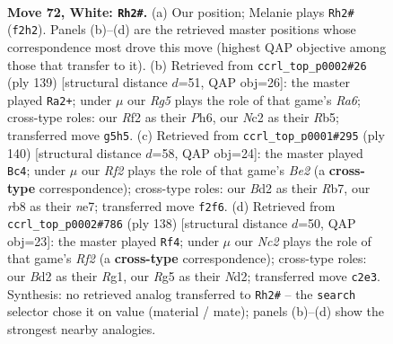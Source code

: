 \documentclass[11pt]{article}
\begin{document}
\clearpage

\begin{figure}[p]\centering
\begin{subfigure}{0.46\textwidth}\centering
\resizebox{\linewidth}{!}{%
\newchessgame
\chessboard[
  setfen={1rr5/pn5k/1p2p3/4P1R1/2P5/K5P1/P1NB1R2/8 w - - 3 72},
  showmover=false,
  pgfstyle=straightmove, color=movearrow, markmove={f2-h2}
]}
\caption{}
\end{subfigure}\hfill
\begin{subfigure}{0.46\textwidth}\centering
\resizebox{\linewidth}{!}{%
\newchessgame
\chessboard[
  setfen={2R5/2R2p1k/5P1p/1r1pp1p1/1P4P1/r6P/3K4/8 b - - 14 70},
  showmover=false,
  pgfstyle=straightmove, color=movearrow, markmove={a3-a2}
]}
\caption{}
\end{subfigure}
\\[4pt]
\begin{subfigure}{0.46\textwidth}\centering
\resizebox{\linewidth}{!}{%
\newchessgame
\chessboard[
  setfen={4r2k/1R2n3/4rp1p/7P/5P2/4P3/4BK2/7R w - - 0 71},
  showmover=false,
  pgfstyle=straightmove, color=movearrow, markmove={e2-c4}
]}
\caption{}
\end{subfigure}\hfill
\begin{subfigure}{0.46\textwidth}\centering
\resizebox{\linewidth}{!}{%
\newchessgame
\chessboard[
  setfen={4r3/6r1/2k5/p1p3P1/P2p4/4n2P/3N1R1K/6R1 w - - 1 70},
  showmover=false,
  pgfstyle=straightmove, color=movearrow, markmove={f2-f4}
]}
\caption{}
\end{subfigure}
\caption{\textbf{Move 72, White: \texttt{Rh2\#}.} (a) Our position; Melanie plays \texttt{Rh2\#} (\texttt{f2h2}). Panels (b)--(d) are the retrieved master positions whose correspondence most drove this move (highest QAP objective among those that transfer to it). (b) Retrieved from \texttt{ccrl\_top\_p0002\#26} (ply 139) [structural distance $d$=51, QAP obj=26]: the master played \texttt{Ra2+}; under $\mu$ our \emph{Rg5} plays the role of that game's \emph{Ra6}; cross-type roles: our \emph{R}f2 as their \emph{P}h6, our \emph{N}c2 as their \emph{R}b5; transferred move \texttt{g5h5}. (c) Retrieved from \texttt{ccrl\_top\_p0001\#295} (ply 140) [structural distance $d$=58, QAP obj=24]: the master played \texttt{Bc4}; under $\mu$ our \emph{Rf2} plays the role of that game's \emph{Be2} (a \textbf{cross-type} correspondence); cross-type roles: our \emph{B}d2 as their \emph{R}b7, our \emph{r}b8 as their \emph{n}e7; transferred move \texttt{f2f6}. (d) Retrieved from \texttt{ccrl\_top\_p0002\#786} (ply 138) [structural distance $d$=50, QAP obj=23]: the master played \texttt{Rf4}; under $\mu$ our \emph{Nc2} plays the role of that game's \emph{Rf2} (a \textbf{cross-type} correspondence); cross-type roles: our \emph{B}d2 as their \emph{R}g1, our \emph{R}g5 as their \emph{N}d2; transferred move \texttt{c2e3}. Synthesis: no retrieved analog transferred to \texttt{Rh2\#} -- the \texttt{search} selector chose it on value (material / mate); panels (b)--(d) show the strongest nearby analogies.}
\label{fig:thought-m142}
\end{figure}
\end{document}
